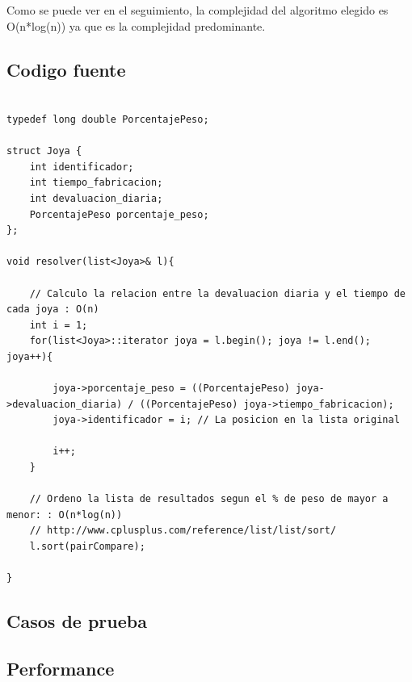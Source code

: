 Como se puede ver en el seguimiento, la complejidad del algoritmo elegido es O(n*log(n)) ya que es la complejidad predominante.\\

\subsection{Codigo fuente}

\begin{lstlisting}
               
typedef long double PorcentajePeso;

struct Joya {
	int identificador;
	int tiempo_fabricacion;
	int devaluacion_diaria;
	PorcentajePeso porcentaje_peso;
};

void resolver(list<Joya>& l){
	
	// Calculo la relacion entre la devaluacion diaria y el tiempo de cada joya : O(n)
	int i = 1;
	for(list<Joya>::iterator joya = l.begin(); joya != l.end(); joya++){
		
		joya->porcentaje_peso = ((PorcentajePeso) joya->devaluacion_diaria) / ((PorcentajePeso) joya->tiempo_fabricacion);
		joya->identificador = i; // La posicion en la lista original
		
		i++;
	}
	
	// Ordeno la lista de resultados segun el % de peso de mayor a menor: : O(n*log(n)) 
	// http://www.cplusplus.com/reference/list/list/sort/
	l.sort(pairCompare);

}
\end{lstlisting}

\subsection{Casos de prueba}

\subsection{Performance}
